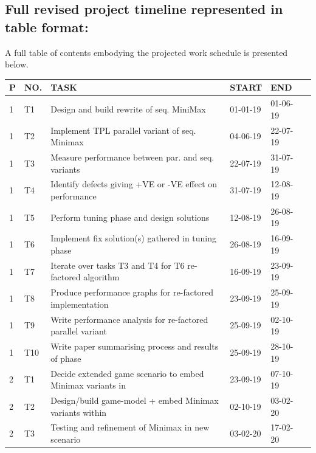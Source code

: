 \documentclass[12pt]{article}
\begin{document}
\subsection{Full revised project timeline represented in table format:}
A full table of contents embodying the projected work schedule is presented below.
\begin{center}
     \begin{tabular}{ | l | l | l | l | l | p{10cm} |}
    \hline
       \textbf{P} & \textbf{NO.} & \textbf{TASK} & \textbf{START} & \textbf{END}
    \\ \hline
  \colorbox{blue!30}{1} & T1 & Design and build rewrite of seq. MiniMax &    01-01-19 &
     01-06-19 \\ \hline
      \colorbox{blue!30}{1} & T2 & Implement TPL parallel variant of seq. Minimax & 04-06-19 & 22-07-19 \\ \hline
      \colorbox{blue!30}{1} & T3 & Measure performance between par. and seq. variants & 22-07-19 & 31-07-19 \\ \hline
       \colorbox{blue!30}{1} & T4 & Identify defects giving +VE or -VE effect on performance & 31-07-19 & 12-08-19 \\ \hline
          \colorbox{blue!30}{1} & T5 & Perform tuning phase and design solutions & 12-08-19 & 26-08-19 \\ \hline
          \colorbox{blue!30}{1} & T6 & Implement fix solution(s) gathered in tuning phase & 26-08-19 & 16-09-19 \\ \hline
           \colorbox{blue!30}{1} & T7 & Iterate over tasks T3 and T4 for T6 re-factored algorithm & 16-09-19 & 23-09-19 \\ \hline
       \colorbox{blue!30}{1} & T8 & Produce performance graphs for re-factored implementation & 23-09-19 & 25-09-19 \\ \hline
     \colorbox{blue!30}{1} & T9 & Write performance analysis for re-factored parallel variant & 25-09-19 & 02-10-19 \\ \hline
      \colorbox{blue!30}{1} & T10 & Write paper summarising process and results of phase & 25-09-19 & 28-10-19
  \\ \hline
     \colorbox{green!30}{2} & T1 & Decide extended game scenario to embed Minimax variants in & 23-09-19 & 07-10-19
       \\ \hline
       \colorbox{green!30}{2} & T2 & Design/build game-model + embed Minimax variants within & 02-10-19 & 03-02-20
       \\ \hline
              \colorbox{green!30}{2} & T3 & Testing and refinement of Minimax in new scenario & 03-02-20 & 17-02-20

\end{tabular}
\end{center}
\end{document}
